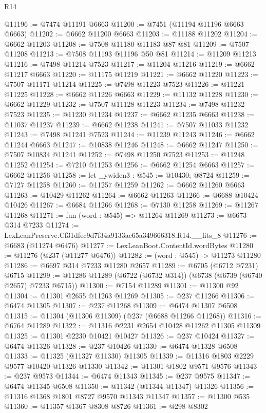 \begin{lexlean}{R14}
\begin{coremodule}
@11196 := @7474 @11191 @6663
@11200 := @7451 (@11194 @11196 @6663 @6663)
@11202 := @6662 @11200 @6663
@11203 := @11188 @11202
@11204 := @6662 @11203
@11208 := @7508 @11180 @11183 @87 @81
@11209 := @7507 @11208
@11213 := @7508 @11193 @11196 @50 @81
@11214 := @11209 @11213
@11216 := @7498 @11214 @7523
@11217 := @11204 @11216
@11219 := @6662 @11217 @6663
@11220 := @11175 @11219
@11221 := @6662 @11220
@11223 := @7507 @11171 @11214
@11225 := @7498 @11223 @7523
@11226 := @11221 @11225
@11228 := @6662 @11226 @6663
@11229 := @11132 @11228
@11230 := @6662 @11229
@11232 := @7507 @11128 @11223
@11234 := @7498 @11232 @7523
@11235 := @11230 @11234
@11237 := @6662 @11235 @6663
@11238 := @11037 @11237
@11239 := @6662 @11238
@11241 := @7507 @11033 @11232
@11243 := @7498 @11241 @7523
@11244 := @11239 @11243
@11246 := @6662 @11244 @6663
@11247 := @10838 @11246
@11248 := @6662 @11247
@11250 := @7507 @10834 @11241
@11252 := @7498 @11250 @7523
@11253 := @11248 @11252
@11254 := @7210 @11253
@11256 := @6662 @11254 @6663
@11257 := @6662 @11256
@11258 := let _ywiden3 : @545 := @10430; @8724
@11259 := @7127 @11258
@11260 := @11257 @11259
@11262 := @6662 @11260 @6663
@11263 := @10429 @11262
@11264 := @6662 @11263
@11266 := @6688 @10424 @10426
@11267 := @6684 @11266
@11268 := @7130 @11258
@11269 := @11267 @11268
@11271 := fun (word : @545) => @11264 @11269
@11273 := @6673 @314 @7233
@11274 := LexLeanPreserve.Cf31dfec9d7f34a9133ae65a349666318.R14.__fits_8
@11276 := @6683 (@11274 @6476)
@11277 := LexLeanBoot.ContentId.wordBytes
@11280 := @11276 (@237 (@11277 @6476))
@11282 := (word : @545) -> @11273 @11280
@11286 := @6697 @314 @7233 @11280 @2657
@11289 := @6705 (@6712 @7231) @6715
@11299 := @11286 @11289 (@6722 (@6732 @314)) (@6738 (@6739 (@6740 @2657) @7233 @6715))
@11300 := @7154 @11289
@11301 := @11300 @92
@11304 := @11301 @2655 @11263 @11269
@11305 := @237 @11266
@11306 := @6474 @11305
@11307 := @237 @11268
@11309 := @6474 @11307 @6508
@11315 := @11304 (@11306 @11309) (@237 (@6688 @11266 @11268))
@11316 := @6764 @11289
@11322 := @11316 @2231 @2654 @10428 @11262 @11305 @11309
@11325 := @11301 @2230 @10421 @10427
@11326 := @237 @10424
@11327 := @6474 @11326
@11328 := @237 @10426
@11330 := @6474 @11328 @6508
@11333 := @11325 (@11327 @11330) @11305
@11339 := @11316 @1803 @2229 @9577 @10420 @11326 @11330
@11342 := @11301 @1802 @9571 @9576
@11343 := @237 @9573
@11344 := @6474 @11343
@11345 := @237 @9575
@11347 := @6474 @11345 @6508
@11350 := @11342 (@11344 @11347) @11326
@11356 := @11316 @1368 @1801 @8727 @9570 @11343 @11347
@11357 := @11300 @535
@11360 := @11357 @1367 @8308 @8726
@11361 := @298 @8302

\end{coremodule}
\end{lexlean}
